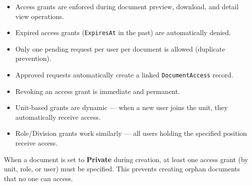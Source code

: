 \begin{itemize}[leftmargin=18pt]
  \item Access grants are enforced during document preview,
        download, and detail view operations.
  \item Expired access grants (\texttt{ExpiresAt} in the past)
        are automatically denied.
  \item Only one pending request per user per document is
        allowed (duplicate prevention).
  \item Approved requests automatically create a linked
        \texttt{DocumentAccess} record.
  \item Revoking an access grant is immediate and permanent.
  \item Unit-based grants are dynamic --- when a new user
        joins the unit, they automatically receive access.
  \item Role/Division grants work similarly --- all users
        holding the specified position receive access.
\end{itemize}

\begin{ugImportant}
  When a document is set to \textbf{Private} during creation,
  at least one access grant (by unit, role, or user) must be
  specified. This prevents creating orphan documents that no
  one can access.
\end{ugImportant}

\newpage
